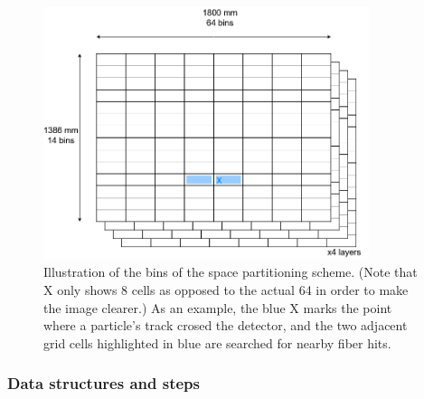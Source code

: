 \documentclass[12pt]{article}
\begin{document}
\begin{figure}[H]
	\begin{center}
		\includegraphics[width=0.85\textwidth]{velout_space_partitioning}
	\end{center}
	\caption{Illustration of the bins of the space partitioning scheme. (Note that X only shows 8 cells as opposed to the actual 64 in order to make the image clearer.) As an example, the blue X marks the point where a particle's track crosed the detector, and the two adjacent grid cells highlighted in blue are searched for nearby fiber hits.}
	\label{fig_velout_space_partitioning}
\end{figure}


\subsubsection{Data structures and steps}
\end{document}
